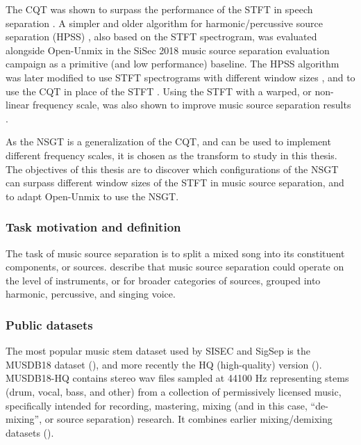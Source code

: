 \documentclass[report.tex]{subfiles}
\begin{document}
The CQT was shown to surpass the performance of the STFT in speech separation \cite{cqtseparation}. A simpler and older algorithm for harmonic/percussive source separation (HPSS) \cite{fitzgerald1}, also based on the STFT spectrogram, was evaluated alongside Open-Unmix in the SiSec 2018 music source separation evaluation campaign \cite{sisec2018} as a primitive (and low performance) baseline. The HPSS algorithm was later modified to use STFT spectrograms with different window sizes \cite{driedger, fitzgerald2}, and to use the CQT in place of the STFT \cite{fitzgerald2}. Using the STFT with a warped, or non-linear frequency scale, was also shown to improve music source separation results \cite{bettermusicsep}.

As the NSGT is a generalization of the CQT, and can be used to implement different frequency scales, it is chosen as the transform to study in this thesis. The objectives of this thesis are to discover which configurations of the NSGT can surpass different window sizes of the STFT in music source separation, and to adapt Open-Unmix to use the NSGT.


\subsubsection{Task motivation and definition}


The task of music source separation is to split a mixed song into its constituent components, or sources. \textcite{musicsepgood} describe that music source separation could operate on the level of instruments, or for broader categories of sources, grouped into harmonic, percussive, and singing voice.

\subsubsection{Public datasets}

The most popular music stem dataset used by SISEC and SigSep is the MUSDB18 dataset (\cite{musdb18}), and more recently the HQ (high-quality) version (\cite{musdb18hq}). MUSDB18-HQ contains stereo wav files sampled at 44100 Hz representing stems (drum, vocal, bass, and other) from a collection of permissively licensed music, specifically intended for recording, mastering, mixing (and in this case, ``de-mixing'', or source separation) research. It combines earlier mixing/demixing datasets (\cite{otherdataset1, otherdataset2}).
\end{document}
